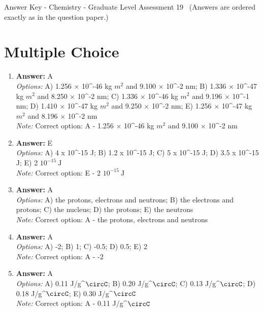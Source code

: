 \documentclass[12pt]{article}
\begin{document}
\begin{center}
Answer Key - Chemistry - Graduate Level Assessment 19 \
\small (Answers are ordered exactly as in the question paper.)
\end{center}

\section*{Multiple Choice}
\begin{enumerate}[label=\arabic*.]
\item \textbf{Answer:} A
\\ \textit{Options:} A) 1.256 \ensuremath{\times} 10^-46 kg $m^2$ and 9.100 \ensuremath{\times} 10^-2 nm; B) 1.336 \ensuremath{\times} 10^-47 kg $m^2$ and 8.250 \ensuremath{\times} 10^-2 nm; C) 1.336 \ensuremath{\times} 10^-46 kg $m^2$ and 9.196 \ensuremath{\times} 10^-1 nm; D) 1.410 \ensuremath{\times} 10^-47 kg $m^2$ and 9.250 \ensuremath{\times} 10^-2 nm; E) 1.256 \ensuremath{\times} 10^-47 kg $m^2$ and 8.196 \ensuremath{\times} 10^-2 nm
\\ \textit{Note:} Correct option: A - 1.256 \ensuremath{\times} 10^-46 kg $m^2$ and 9.100 \ensuremath{\times} 10^-2 nm
\item \textbf{Answer:} E
\\ \textit{Options:} A) 4 x 10^-15 J; B) 1.2 x 10^-15 J; C) 5 x 10^-15 J; D) 3.5 x 10^-15 J; E) 2 $10^{-15} \mathrm{~J}$
\\ \textit{Note:} Correct option: E - 2 $10^{-15} \mathrm{~J}$
\item \textbf{Answer:} A
\\ \textit{Options:} A) the protons, electrons and neutrons; B) the electrons and protons; C) the nucleus; D) the protons; E) the neutrons
\\ \textit{Note:} Correct option: A - the protons, electrons and neutrons
\item \textbf{Answer:} A
\\ \textit{Options:} A) -2; B) 1; C) -0.5; D) 0.5; E) 2
\\ \textit{Note:} Correct option: A - -2
\item \textbf{Answer:} A
\\ \textit{Options:} A) 0.11 J/g^\ensuremath{\circC}; B) 0.20 J/g^\ensuremath{\circC}; C) 0.13 J/g^\ensuremath{\circC}; D) 0.18 J/g^\ensuremath{\circC}; E) 0.30 J/g^\ensuremath{\circC}
\\ \textit{Note:} Correct option: A - 0.11 J/g^\ensuremath{\circC}
\end{enumerate}
\end{document}
